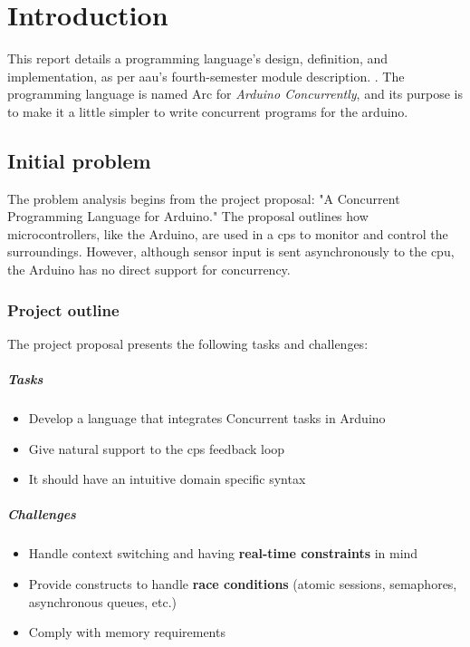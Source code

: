 \chapter{Introduction}\label{cha:introduction}
This report details a programming language’s design, definition, and implementation, as per \gls{aau}'s fourth-semester module description. \cite{AAU_Modules_P4}. The programming language is named Arc for \textit{Arduino Concurrently}, and its purpose is to make it a little simpler to write concurrent programs for the arduino.

\section{Initial problem}\label{sec:initialproblem}
The problem analysis begins from the project proposal: "A Concurrent Programming Language for Arduino." The proposal outlines how microcontrollers, like the Arduino, are used in a \gls{cps} to monitor and control the surroundings. However, although sensor input is sent asynchronously to the \gls{cpu}, the Arduino has no direct support for concurrency.

\subsection{Project outline}
The project proposal presents the following tasks and challenges:

\paragraph{Tasks}
\begin{itemize}
    \item Develop a language that integrates Concurrent tasks in Arduino
    \item Give natural support to the \gls{cps} feedback loop
    \item It should have an intuitive domain specific syntax
\end{itemize}

\paragraph{Challenges}
\begin{itemize}
    \item Handle context switching and having \textbf{real-time constraints} in mind
    \item Provide constructs to handle \textbf{race conditions} (atomic sessions, semaphores, asynchronous queues, etc.)
    \item Comply with memory requirements
\end{itemize}

